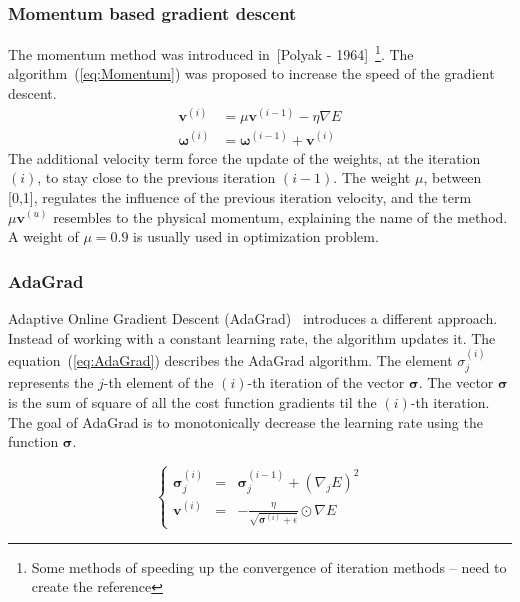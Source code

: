 \documentclass[final, paper=letter,5p,times,twocolumn]{elsarticle}
\begin{document}
\subsubsection{Momentum based gradient descent}
The momentum method was introduced in~[Polyak - 1964]~\footnote{Some methods of speeding up the convergence of iteration methods -- need to create the reference}. The algorithm~(\ref{eq:Momentum}) was proposed to increase the speed of the gradient descent. 
\begin{equation}
\left.
\begin{aligned}
\bm{v}^{(i)}      & = \mu \bm{v}^{(i-1)} - \eta \nabla E
\\
\bm{\omega}^{(i)} & = \bm{\omega}^{(i-1)} + \bm{v}^{(i)}
\end{aligned}
\right.
\label{eq:Momentum}
\end{equation}
The additional velocity term force the update of the weights, at the iteration $(i)$, to stay close to the previous iteration $(i-1)$. The weight $\mu$, between [0,1], regulates the influence of the previous iteration velocity, and the term $\mu \bm{v}^{(u)}$ resembles to the physical momentum, explaining the name of the method. A weight of $\mu = 0.9$ is usually used in optimization problem.

\subsubsection{AdaGrad}
Adaptive Online Gradient Descent (AdaGrad)~\cite{adagrad} introduces a different approach. Instead of working with a constant learning rate, the algorithm updates it. The equation~(\ref{eq:AdaGrad}) describes the AdaGrad algorithm. The element $\sigma_{j}^{(i)}$ represents the $j$-th element of the $(i)$-th iteration of the vector $\bm{\sigma}$. The vector $\bm{\sigma}$ is the sum of square of all the cost function gradients til the $(i)$-th iteration. The goal of AdaGrad is to monotonically decrease the learning rate using the function $\bm{\sigma}$.

\begin{equation}
\left\lbrace
\begin{array}{ccc}
\bm{\sigma}_{j}^{(i)} & = & \bm{\sigma}_{j}^{(i-1)} + (\nabla_{j} E)^{2} \\
\bm{v}^{(i)} & = & -\frac{\eta}{\sqrt{\bm{\sigma}^{(i)} + \epsilon}} \odot \nabla E
\end{array}
\right.
\label{eq:AdaGrad}
\end{equation}
\end{document}
